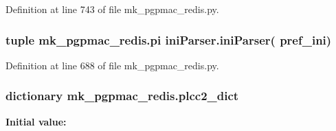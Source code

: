 Definition at line 743 of file mk\-\_\-pgpmac\-\_\-redis.\-py.

\hypertarget{namespacemk__pgpmac__redis_a2f5bbda0250eecd94d166dc0a2fbff86}{
\subsubsection[{pi}]{\setlength{\rightskip}{0pt plus 5cm}tuple mk\-\_\-pgpmac\-\_\-redis.\-pi {\bf ini\-Parser.\-ini\-Parser}( {\bf pref\-\_\-ini})}}\label{namespacemk__pgpmac__redis_a2f5bbda0250eecd94d166dc0a2fbff86}


Definition at line 688 of file mk\-\_\-pgpmac\-\_\-redis.\-py.

\hypertarget{namespacemk__pgpmac__redis_a70d6a840305f17ce4f2936166fa2750e}{
\subsubsection[{plcc2\-\_\-dict}]{\setlength{\rightskip}{0pt plus 5cm}dictionary mk\-\_\-pgpmac\-\_\-redis.\-plcc2\-\_\-dict}}\label{namespacemk__pgpmac__redis_a70d6a840305f17ce4f2936166fa2750e}
{\bfseries Initial value\-:}
